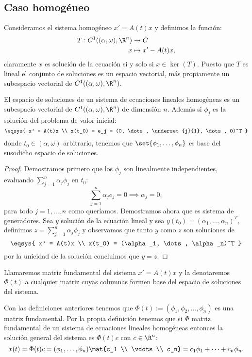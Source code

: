 \documentclass[../main.tex]{subfiles}
\begin{document}
\subsection{Caso homogéneo}

Consideramos el sistema homogéneo \(x' = A(t) x\) y definimos la función:
\begin{align*}
	T : C^1((\alpha, \omega), \R^n) &\to C \\
	x &\mapsto x' - A(t)x,
\end{align*}
claramente \(x\) es solución de la ecuación si y solo si \(x \in \ker(T)\).
Puesto que \(T\) es lineal el conjunto de soluciones es un espacio vectorial,
más propiamente un subespacio vectorial de \(C^1((\alpha, \omega), \R^n)\).

\begin{theorem}
	El espacio de soluciones de un sistema de ecuaciones lineales homogéneas es
	un subespacio vectorial de \(C^1((\alpha, \omega), \R^n)\) de dimensión 
	\(n\). Además si \(\phi_j\) es la solución del problema de valor inicial:
	\[\eqsys{
		x' = A(t)x \\
		x(t_0) = e_j = (0, \dots, \underset{j}{1}, \dots, 0)^T
		}\]
	donde \(t_0 \in (\alpha, \omega)\) arbitrario, tenemos que
	\(\set{\phi_1, \dots, \phi_n}\) es base del susodicho espacio de soluciones.
\end{theorem}

\begin{proof}
	Demostramos primero que los \(\phi_j\) son linealmente independientes,
	evaluando \(\sum_{j = 1}^n \alpha_j \phi_j\) en \(t_0\):
	\[\sum_{j = 1}^n \alpha_j e_j = 0 \implies \alpha_j = 0,\]
	para todo \(j = 1, \dots, n\) como queríamos. Demostramos ahora que es
	sistema de generadores. Sea \(y\) solución de la ecuación lineal y sea
	\(y(t_0) = (\alpha_1, \dots, \alpha_n)^T\), definimos 
	\(z = \sum_{j = 1}^n \alpha_j \phi_j\) y observamos que tanto \(y\) como
	\(z\) son soluciones de
	\[\eqsys{
		x' = A(t)x \\
		x(t_0) = (\alpha_1, \dots, \alpha_n)^T
		}\]
	por la unicidad de la solución concluimos que \(y = z\).
\end{proof}

\begin{definition}
	Llamaremos matriz fundamental del sistema \(x' = A(t)x\) y la denotaremos
	\(\Phi(t)\) a cualquier matriz cuyas columnas formen base del espacio de 
	soluciones del sistema.
\end{definition}

Con las definiciones anteriores tenemos que \(\Phi(t) := 
(\phi_1, \phi_2, \dots, \phi_n)\) es una matriz fundamental. Por la propia 
definición tenemos que si \(\Phi\) matriz fundamental de un sistema
de ecuaciones lineales homogéneas  entonces la solución general del sistema es
\(\Phi(t)c\) con \(c \in \R^n\):
\[x(t) = \Phi(t) c = (\phi_1, \dots, \phi_n) \mat{c_1 \\ \vdots \\ c_n} =
	c_1\phi_1 + \cdots + c_n\phi_n.\]
\end{document}

